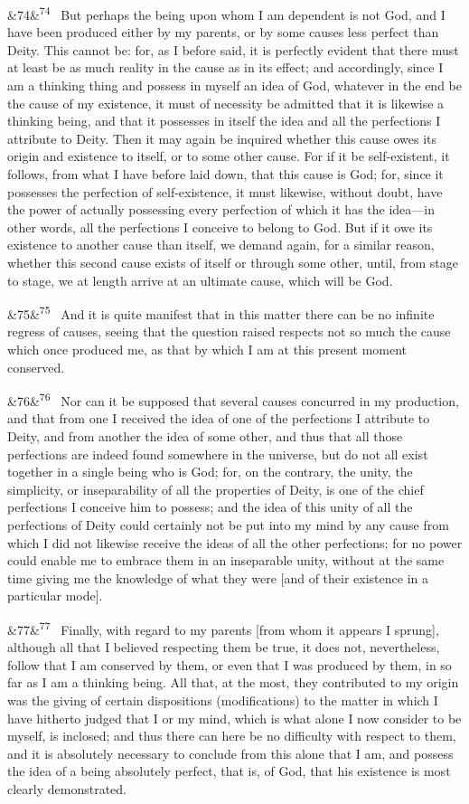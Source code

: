\documentclass[12pt]{article}
\newcommand{\para}[1][]{\par\noindent\ifx&#1&\else\textsuperscript{\footnotesize #1}~\fi}
\begin{document}
\para[74] But perhaps the being upon whom I am dependent is not God, and I have been produced either by my parents, or by some causes less perfect than Deity. This cannot be: for, as I before said, it is perfectly evident that there must at least be as much reality in the cause as in its effect; and accordingly, since I am a thinking thing and possess in myself an idea of God, whatever in the end be the cause of my existence, it must of necessity be admitted that it is likewise a thinking being, and that it possesses in itself the idea and all the perfections I attribute to Deity. Then it may again be inquired whether this cause owes its origin and existence to itself, or to some other cause. For if it be self-existent, it follows, from what I have before laid down, that this cause is God; for, since it possesses the perfection of self-existence, it must likewise, without doubt, have the power of actually possessing every perfection of which it has the idea---in other words, all the perfections I conceive to belong to God. But if it owe its existence to another cause than itself, we demand again, for a similar reason, whether this second cause exists of itself or through some other, until, from stage to stage, we at length arrive at an ultimate cause, which will be God.

\para[75] And it is quite manifest that in this matter there can be no infinite regress of causes, seeing that the question raised respects not so much the cause which once produced me, as that by which I am at this present moment conserved.

\para[76] Nor can it be supposed that several causes concurred in my production, and that from one I received the idea of one of the perfections I attribute to Deity, and from another the idea of some other, and thus that all those perfections are indeed found somewhere in the universe, but do not all exist together in a single being who is God; for, on the contrary, the unity, the simplicity, or inseparability of all the properties of Deity, is one of the chief perfections I conceive him to possess; and the idea of this unity of all the perfections of Deity could certainly not be put into my mind by any cause from which I did not likewise receive the ideas of all the other perfections; for no power could enable me to embrace them in an inseparable unity, without at the same time giving me the knowledge of what they were [and of their existence in a particular mode].

\para[77] Finally, with regard to my parents [from whom it appears I sprung], although all that I believed respecting them be true, it does not, nevertheless, follow that I am conserved by them, or even that I was produced by them, in so far as I am a thinking being. All that, at the most, they contributed to my origin was the giving of certain dispositions (modifications) to the matter in which I have hitherto judged that I or my mind, which is what alone I now consider to be myself, is inclosed; and thus there can here be no difficulty with respect to them, and it is absolutely necessary to conclude from this alone that I am, and possess the idea of a being absolutely perfect, that is, of God, that his existence is most clearly demonstrated.
\end{document}

